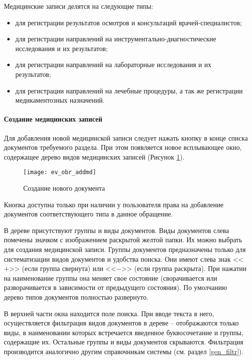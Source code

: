 {Медицинские записи делятся на следующие типы:
\begin{itemize}
 \item {} для регистрации результатов осмотров и консультаций врачей-специалистов;
 \item {} для регистрации направлений на инструментально-диагностические исследования и их результатов;
 \item {} для регистрации направлений на лабораторные исследования и их результатов;
 \item {} для регистрации направлений на лечебные процедуры, а так же регистрации медикаментозных назначений. 
\end{itemize}

\paragraph{Создание медицинских записей} \label{pol_obr_mdnew}

Для добавления новой медицинской записи следует нажать кнопку  в конце списка документов требуемого раздела. При этом появляется новое всплывающее окно, содержащее дерево видов медицинских записей (Рисунок \ref{img_ev_obr_addmd}).

\begin{figure}[ht]\centering
 \texttt{[image: ev\_obr\_addmd]}
 \caption{Создание нового документа}
 \label{img_ev_obr_addmd}
\end{figure}

\begin{vnim}
 Кнопка  доступна только при наличии у пользователя права на добавление документов соответствующего типа в данное обращение.
\end{vnim} 

В дереве присутствуют группы и виды документов. Виды документов слева помечены значком с изображением раскрытой желтой папки. Их можно выбрать для создания медицинской записи. Группы документов предназначены только для систематизации видов документов и удобства поиска. Они имеют слева знак <<$+$>> (если группа свернута) или <<$-$>> (если группа раскрыта). При нажатии на наименование группы она меняет свое состояние (сворачивается или разворачивается в зависимости от предыдущего состояния). По умолчанию дерево типов документов полностью развернуто. 

В верхней части окна находится поле поиска. При вводе текста в него, осуществляется фильтрация видов документов в дереве -- отображаются только виды, в наименовании которых встречается введенное буквосочетание и группы, содержащие их. Остальные  группы и виды документов скрываются. Фильтрация производится аналогично другим справочникам системы (см. раздел \ref{gen_filtr}). 

}
